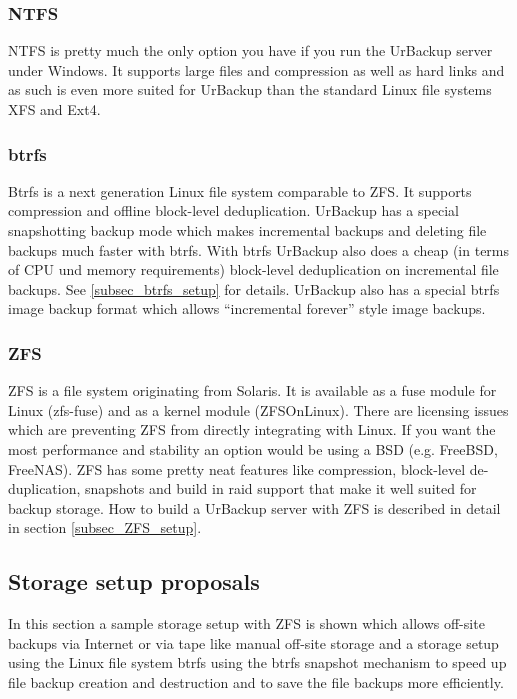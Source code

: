 \documentclass[a4paper,10pt]{article}
\begin{document}
\subsubsection{NTFS}

NTFS is pretty much the only option you have if you run the UrBackup server under Windows. It supports large files and compression as well as hard links and as such is even more suited for UrBackup than the standard Linux file systems XFS and Ext4. 

\subsubsection{btrfs}

Btrfs is a next generation Linux file system comparable to ZFS.
It supports compression and offline block-level deduplication. UrBackup has a special snapshotting backup
mode which makes incremental backups and deleting file backups much faster with btrfs. With btrfs UrBackup also does a cheap (in terms of CPU und memory requirements) block-level deduplication on incremental file backups. See \ref{subsec_btrfs_setup} for details. UrBackup also has a special btrfs image backup format which allows ``incremental forever'' style image backups.

\subsubsection{ZFS}

ZFS is a file system originating from Solaris.
It is available as a fuse module for Linux (zfs-fuse) and as a kernel module (ZFSOnLinux).
There are licensing issues which are preventing ZFS from directly integrating with Linux.
If you want the most performance and stability an option would be using a BSD (e.g. FreeBSD, FreeNAS).
ZFS has some pretty neat features like compression, block-level de-duplication, snapshots and build
in raid support that make it well suited for backup storage.
How to build a UrBackup server with ZFS is described in detail in section \ref{subsec_ZFS_setup}.


\subsection{Storage setup proposals}
\label{sec_storage_proposals}

In this section a sample storage setup with ZFS is shown which allows off-site
backups via Internet or via tape like manual off-site storage and a storage setup
using the Linux file system btrfs using the btrfs snapshot mechanism to speed
up file backup creation and destruction and to save the file backups more efficiently.
\end{document}
